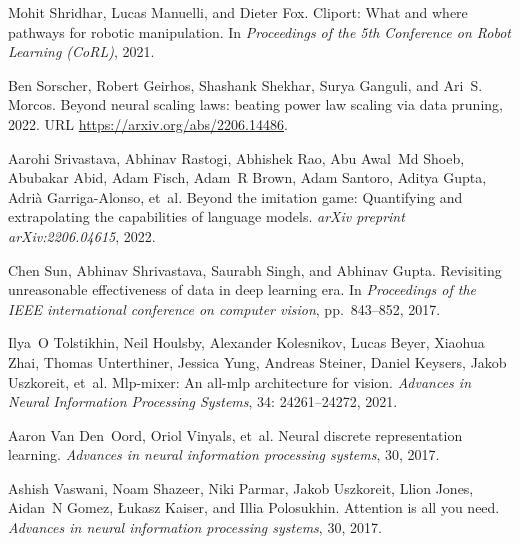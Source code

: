 \documentclass{article} %
\begin{document}
\begin{thebibliography}{62}
Mohit Shridhar, Lucas Manuelli, and Dieter Fox.
\newblock Cliport: What and where pathways for robotic manipulation.
\newblock In \emph{Proceedings of the 5th Conference on Robot Learning (CoRL)},
  2021.

Ben Sorscher, Robert Geirhos, Shashank Shekhar, Surya Ganguli, and Ari~S.
  Morcos.
\newblock Beyond neural scaling laws: beating power law scaling via data
  pruning, 2022.
\newblock URL \url{https://arxiv.org/abs/2206.14486}.

Aarohi Srivastava, Abhinav Rastogi, Abhishek Rao, Abu Awal~Md Shoeb, Abubakar
  Abid, Adam Fisch, Adam~R Brown, Adam Santoro, Aditya Gupta, Adri{\`a}
  Garriga-Alonso, et~al.
\newblock Beyond the imitation game: Quantifying and extrapolating the
  capabilities of language models.
\newblock \emph{arXiv preprint arXiv:2206.04615}, 2022.

Chen Sun, Abhinav Shrivastava, Saurabh Singh, and Abhinav Gupta.
\newblock Revisiting unreasonable effectiveness of data in deep learning era.
\newblock In \emph{Proceedings of the IEEE international conference on computer
  vision}, pp.\  843--852, 2017.

Ilya~O Tolstikhin, Neil Houlsby, Alexander Kolesnikov, Lucas Beyer, Xiaohua
  Zhai, Thomas Unterthiner, Jessica Yung, Andreas Steiner, Daniel Keysers,
  Jakob Uszkoreit, et~al.
\newblock Mlp-mixer: An all-mlp architecture for vision.
\newblock \emph{Advances in Neural Information Processing Systems},
  34: 24261--24272, 2021.

Aaron Van Den~Oord, Oriol Vinyals, et~al.
\newblock Neural discrete representation learning.
\newblock \emph{Advances in neural information processing systems}, 30, 2017.

Ashish Vaswani, Noam Shazeer, Niki Parmar, Jakob Uszkoreit, Llion Jones,
  Aidan~N Gomez, {\L}ukasz Kaiser, and Illia Polosukhin.
\newblock Attention is all you need.
\newblock \emph{Advances in neural information processing systems}, 30, 2017.


\end{thebibliography}
\end{document}
